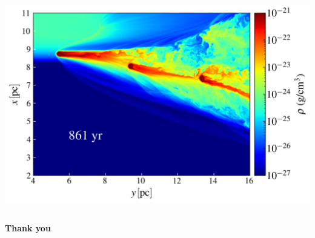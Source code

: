\begin{frame}
\begin{columns}
{\begin{column}{0.5\textwidth}
			\includegraphics[width=\textwidth]{images/jbs3_130.png}
		\end{column}}
	\end{columns}
\end{frame}

\begin{frame}{}
	\centering
	\Huge{\textbf{Thank you}}
\end{frame}

